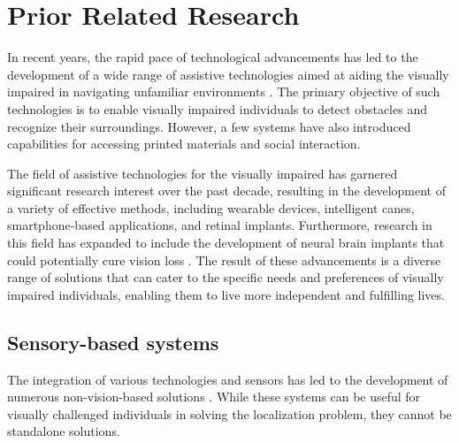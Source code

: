 \documentclass[journal,12pt,onecolumn,letterpaper]{IEEEtran}
\begin{document}
\section{Prior Related Research}
\label{Sec:Prior_Research}

In recent years, the rapid pace of technological advancements has led to the development of a wide range of assistive technologies aimed at aiding the visually impaired in navigating unfamiliar environments \cite{real_navigation_2019}. The primary objective of such technologies is to enable visually impaired individuals to detect obstacles and recognize their surroundings. However, a few systems have also introduced capabilities for accessing printed materials and social interaction.

The field of assistive technologies for the visually impaired has garnered significant research interest over the past decade, resulting in the development of a variety of effective methods, including wearable devices, intelligent canes, smartphone-based applications, and retinal implants. Furthermore, research in this field has expanded to include the development of neural brain implants that could potentially cure vision loss \cite{theogarajan_strategies_2012}. The result of these advancements is a diverse range of solutions that can cater to the specific needs and preferences of visually impaired individuals, enabling them to live more independent and fulfilling lives.

\subsection{Sensory-based systems}

The integration of various technologies and sensors has led to the development of numerous non-vision-based solutions \cite{khan_analysis_2021}. While these systems can be useful for visually challenged individuals in solving the localization problem, they cannot be standalone solutions.
\end{document}
